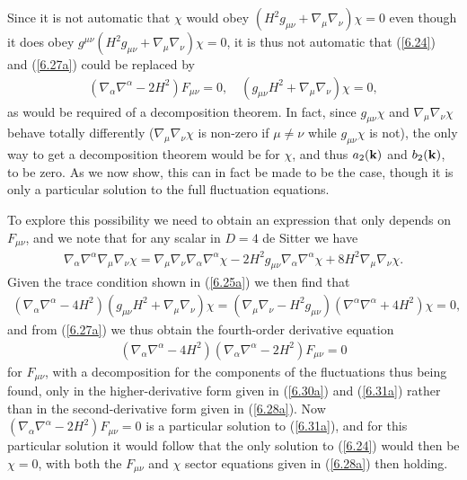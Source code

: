 \documentclass[aps,onecolumn,10pt]{revtex4}
\numberwithin{equation}{section}
\numberwithin{equation}{section}
\begin{document}
Since it is not automatic that $\chi$ would obey $(H^2g_{\mu\nu}+\nabla_{\mu}\nabla_{\nu})\chi=0$ even though it does obey  $g^{\mu\nu}(H^2g_{\mu\nu}+\nabla_{\mu}\nabla_{\nu})\chi=0$, it is thus not automatic that (\ref{6.24}) and (\ref{6.27a}) could be replaced by
%
\begin{eqnarray}
(\nabla_{\alpha}\nabla^{\alpha}-2H^2)F_{\mu\nu}=0,\quad (g_{\mu\nu}H^2+\nabla_{\mu}\nabla_{\nu})\chi=0,
\label{6.28a}
\end{eqnarray}
%
as would be required of a decomposition theorem. In fact, since $g_{\mu\nu}\chi$ and $\nabla_{\mu}\nabla_{\nu}\chi$ behave totally differently ($\nabla_{\mu}\nabla_{\nu}\chi$ is non-zero if $\mu\neq \nu$ while $g_{\mu\nu}\chi$ is not), the only way to get a decomposition theorem would be for $\chi$, and thus $a_2({\bf k})$ and $b_2({\bf k})$,  to be zero. As we now show, this can in fact be made to be the case, though it is only a particular solution to the full fluctuation equations.

To explore this possibility we need to obtain an expression that  only depends on $F_{\mu\nu}$, and we note that for any scalar in  $D=4$ de Sitter we  have \cite{Mannheim2012a}
%
\begin{eqnarray}
\nabla_{\alpha}\nabla^{\alpha}\nabla_{\mu}\nabla_{\nu}\chi=\nabla_{\mu}\nabla_{\nu}\nabla_{\alpha}\nabla^{\alpha}\chi
-2H^2g_{\mu\nu}\nabla_{\alpha}\nabla^{\alpha}\chi
+8H^2\nabla_{\mu}\nabla_{\nu}\chi.
\label{6.29a}
\end{eqnarray}
% 
Given the trace condition shown in (\ref{6.25a})  we then find that
%
\begin{eqnarray}
(\nabla_{\alpha}\nabla^{\alpha}-4H^2)(g_{\mu\nu}H^2+\nabla_{\mu}\nabla_{\nu})\chi
=(\nabla_{\mu}\nabla_{\nu}-H^2g_{\mu\nu})(\nabla^{\alpha}\nabla^{\alpha}+4H^2)\chi=0,
\label{6.30a}
\end{eqnarray}
%
and from (\ref{6.27a}) we thus obtain the fourth-order derivative equation
%
\begin{eqnarray}
(\nabla_{\alpha}\nabla^{\alpha}-4H^2)(\nabla_{\alpha}\nabla^{\alpha}-2H^2)F_{\mu\nu}=0
\label{6.31a}
\end{eqnarray}
%
for $F_{\mu\nu}$, with a decomposition for the components of the fluctuations thus being found, only in the higher-derivative form given in (\ref{6.30a}) and (\ref{6.31a}) rather than in the second-derivative form given in (\ref{6.28a}). Now $(\nabla_{\alpha}\nabla^{\alpha}-2H^2)F_{\mu\nu}=0$ is a particular solution to (\ref{6.31a}), and for this particular solution it would follow that the only solution to (\ref{6.24}) would then be $\chi=0$, with both the $F_{\mu\nu}$ and $\chi$ sector equations given in  (\ref{6.28a}) then holding.
\end{document}
